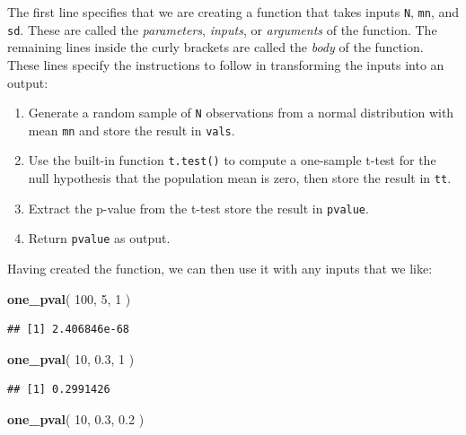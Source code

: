 \documentclass[
]{book}
\newenvironment{Shaded}{\begin{snugshade}}{\end{snugshade}}
\newcommand{\DecValTok}[1]{\textcolor[rgb]{0.00,0.00,0.81}{#1}}
\newcommand{\FloatTok}[1]{\textcolor[rgb]{0.00,0.00,0.81}{#1}}
\newcommand{\FunctionTok}[1]{\textcolor[rgb]{0.13,0.29,0.53}{\textbf{#1}}}
\newcommand{\NormalTok}[1]{#1}
\providecommand{\tightlist}{%
  \setlength{\itemsep}{0pt}\setlength{\parskip}{0pt}}
\begin{document}
The first line specifies that we are creating a function that takes inputs \texttt{N}, \texttt{mn}, and \texttt{sd}. These are called the \emph{parameters}, \emph{inputs}, or \emph{arguments} of the function. The remaining lines inside the curly brackets are called the \emph{body} of the function. These lines specify the instructions to follow in transforming the inputs into an output:

\begin{enumerate}
\def\labelenumi{\arabic{enumi}.}
\tightlist
\item
  Generate a random sample of \texttt{N} observations from a normal distribution with mean \texttt{mn} and store the result in \texttt{vals}.
\item
  Use the built-in function \texttt{t.test()} to compute a one-sample t-test for the null hypothesis that the population mean is zero, then store the result in \texttt{tt}.
\item
  Extract the p-value from the t-test store the result in \texttt{pvalue}.
\item
  Return \texttt{pvalue} as output.
\end{enumerate}

Having created the function, we can then use it with any inputs that we like:

\begin{Shaded}
\begin{Highlighting}[]
\FunctionTok{one\_pval}\NormalTok{( }\DecValTok{100}\NormalTok{, }\DecValTok{5}\NormalTok{, }\DecValTok{1}\NormalTok{ )}
\end{Highlighting}
\end{Shaded}

\begin{verbatim}
## [1] 2.406846e-68
\end{verbatim}

\begin{Shaded}
\begin{Highlighting}[]
\FunctionTok{one\_pval}\NormalTok{( }\DecValTok{10}\NormalTok{, }\FloatTok{0.3}\NormalTok{, }\DecValTok{1}\NormalTok{ )}
\end{Highlighting}
\end{Shaded}

\begin{verbatim}
## [1] 0.2991426
\end{verbatim}

\begin{Shaded}
\begin{Highlighting}[]
\FunctionTok{one\_pval}\NormalTok{( }\DecValTok{10}\NormalTok{, }\FloatTok{0.3}\NormalTok{, }\FloatTok{0.2}\NormalTok{ )}
\end{Highlighting}
\end{Shaded}
\end{document}
